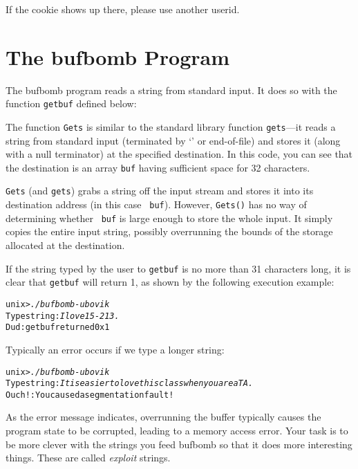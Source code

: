 \documentclass[11pt]{article}
\newenvironment{ccode}%
{\small}%
{}
\newenvironment{tty}%
{\small\begin{alltt}}%
{\end{alltt}}
\begin{document}
If the cookie shows up there, please use another userid.

\section*{The {\sc bufbomb} Program}

The {\sc bufbomb} program reads a string from standard input. It does
so with the function {\tt getbuf} defined below:

\begin{ccode}

\end{ccode}

The function {\tt Gets} is similar to the standard library function
{\tt gets}---it reads a string from standard input (terminated by
`\verb@\n@' or end-of-file) and stores it (along with a null
terminator) at the specified destination.  In this code, you can see
that the destination is an array {\tt buf} having sufficient space for
32 characters.

{\tt Gets} (and {\tt gets}) grabs a string off the input stream and
stores it into its destination address (in this case {\tt
buf}). However, {\tt Gets()} has no way of determining whether {\tt
buf} is large enough to store the whole input.  It simply copies the
entire input string, possibly overrunning the bounds of the storage
allocated at the destination.

If the string typed by the user to {\tt getbuf} is no more than 31
characters long, it is clear that {\tt getbuf} will return 1, as shown
by the following execution example:

\begin{tty}
    unix>{\em ./bufbomb -u bovik}
    Type string:{\em I love 15-213.}
    Dud: getbuf returned 0x1
\end{tty}

Typically an error occurs if we type a longer string:

\begin{tty}
    unix>{\em ./bufbomb -u bovik}
    Type string:{\em It is easier to love this class when you are a TA.}
    Ouch!: You caused a segmentation fault!
\end{tty}

As the error message indicates, overrunning the buffer typically
causes the program state to be corrupted, leading to a memory access
error.  Your task is to be more clever with the strings you feed {\sc
bufbomb} so that it does more interesting things.  These are called
{\em exploit} strings.
\end{document}

